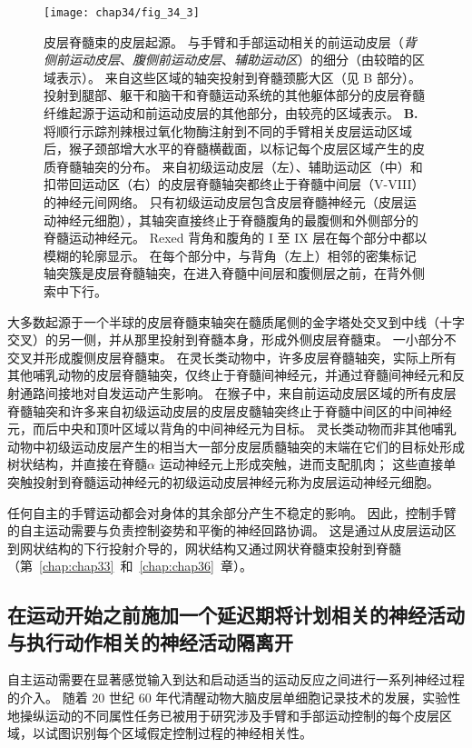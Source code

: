 \begin{figure}[htbp]
	\centering
	\texttt{[image: chap34/fig\_34\_3]}
	\caption{皮层脊髓束的皮层起源。 
		与手臂和手部运动相关的前运动皮层（\textit{背侧前运动皮层}、\textit{腹侧前运动皮层}、\textit{辅助运动区}）的细分（由较暗的区域表示）。
		来自这些区域的轴突投射到脊髓颈膨大区（见 B 部分）。
		投射到腿部、躯干和脑干和脊髓运动系统的其他躯体部分的皮层脊髓纤维起源于运动和前运动皮层的其他部分，由较亮的区域表示。 
		\textbf{B.} 将顺行示踪剂辣根过氧化物酶注射到不同的手臂相关皮层运动区域后，猴子颈部增大水平的脊髓横截面，以标记每个皮层区域产生的皮质脊髓轴突的分布。
		来自初级运动皮层（左）、辅助运动区（中）和扣带回运动区（右）的皮层脊髓轴突都终止于脊髓中间层（V-VIII）的神经元间网络。
		只有初级运动皮层包含皮层脊髓神经元（皮层运动神经元细胞），其轴突直接终止于脊髓腹角的最腹侧和外侧部分的脊髓运动神经元。
		Rexed 背角和腹角的 I 至 IX 层在每个部分中都以模糊的轮廓显示。
		在每个部分中，与背角（左上）相邻的密集标记轴突簇是皮层脊髓轴突，在进入脊髓中间层和腹侧层之前，在背外侧索中下行。}
	\label{fig:34_3}
\end{figure}


大多数起源于一个半球的皮层脊髓束轴突在髓质尾侧的金字塔处交叉到中线（十字交叉）的另一侧，并从那里投射到脊髓本身，形成外侧皮层脊髓束。
一小部分不交叉并形成腹侧皮层脊髓束。
在灵长类动物中，许多皮层脊髓轴突，实际上所有其他哺乳动物的皮层脊髓轴突，仅终止于脊髓间神经元，并通过脊髓间神经元和反射通路间接地对自发运动产生影响。
在猴子中，来自前运动皮层区域的所有皮层脊髓轴突和许多来自初级运动皮层的皮层皮髓轴突终止于脊髓中间区的中间神经元，而后中央和顶叶区域以背角的中间神经元为目标。
灵长类动物而非其他哺乳动物中初级运动皮层产生的相当大一部分皮层质髓轴突的末端在它们的目标处形成树状结构，并直接在脊髓$ \alpha $ 运动神经元上形成突触，进而支配肌肉；
这些直接单突触投射到脊髓运动神经元的初级运动皮层神经元称为皮层运动神经元细胞。


任何自主的手臂运动都会对身体的其余部分产生不稳定的影响。
因此，控制手臂的自主运动需要与负责控制姿势和平衡的神经回路协调。
这是通过从皮层运动区到网状结构的下行投射介导的，网状结构又通过网状脊髓束投射到脊髓（第~\ref{chap:chap33}~和~\ref{chap:chap36}~章）。



\subsection{在运动开始之前施加一个延迟期将计划相关的神经活动与执行动作相关的神经活动隔离开}


自主运动需要在显著感觉输入到达和启动适当的运动反应之间进行一系列神经过程的介入。
随着 20 世纪 60 年代清醒动物大脑皮层单细胞记录技术的发展，实验性地操纵运动的不同属性任务已被用于研究涉及手臂和手部运动控制的每个皮层区域，以试图识别每个区域假定控制过程的神经相关性。


